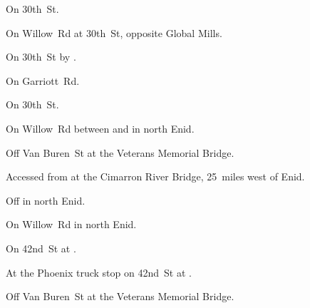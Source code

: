 
\begin{LocationList}

On  30th~St.

On  Willow~Rd at 30th~St, opposite Global Mills.

On  30th~St by .

On  Garriott~Rd.

On  30th~St.

On Willow~Rd between  and   in north Enid.

Off   Van Buren~St at the Veterans Memorial Bridge.

Accessed from    at the Cimarron River Bridge, 25~miles west of Enid.

\Location{\RecruitmentAgency \Recruitment}
Off  in north Enid.

On  Willow~Rd in north Enid.

\Location{\TruckStop \Gas \Rest \Service \Weigh}
On 42nd~St at .

At the Phoenix truck stop on 42nd~St at .

Off   Van Buren~St at the Veterans Memorial Bridge.

\end{LocationList}
